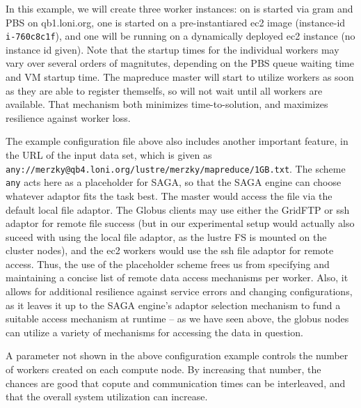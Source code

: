 \documentclass[conference,final]{IEEEtran}
\newcommand{\T}[1]{\texttt{#1}}
\begin{document}
  
  
  

 In this example, we will create three worker instances: on is started
 via gram and PBS on qb1.loni.org, one is started on a
 pre-instantiared ec2 image (instance-id \T{i-760c8c1f}), and one will
 be running on a dynamically deployed ec2 instance (no instance id
 given).  Note that the startup times for the individual workers may
 vary over several orders of magnitutes, depending on the PBS queue
 waiting time and VM startup time.  The mapreduce master will start to
 utilize workers as soon as they are able to register themselfs, so
 will not wait until all workers are available.  That mechanism both
 minimizes time-to-solution, and maximizes resilience against worker
 loss.

 The example configuration file above also includes another important
 feature, in the  URL of the input data set, which is given as
 \T{any://merzky@qb4.loni.org/lustre/merzky/mapreduce/1GB.txt}.  The
 scheme \T{any} acts here as a placeholder for SAGA, so that the SAGA
 engine can choose whatever adaptor fits the task best.  The master
 would access the file via the default local file adaptor.  The Globus
 clients may use either the GridFTP or ssh adaptor for remote file
 success (but in our experimental setup would actually also suceed
 with using the local file adaptor, as the lustre FS is mounted on the
 cluster nodes), and the ec2 workers would use the ssh file adaptor
 for remote access.  Thus, the use of the placeholder scheme frees us
 from specifying and maintaining a concise list of remote data access
 mechanisms per worker.  Also, it allows for additional resilience
 against service errors and changing configurations, as it leaves it
 up to the SAGA engine's adaptor selection mechanism to fund a
 suitable access mechanism at runtime -- as we have seen above, the
 globus nodes can utilize a variety of mechanisms for accessing the
 data in question.

 A parameter not shown in the above configuration example controls the
 number of workers created on each compute node.  By increasing that
 number, the chances are good that copute and communication times can
 be interleaved, and that the overall system utilization can increase.
 
\end{document}
